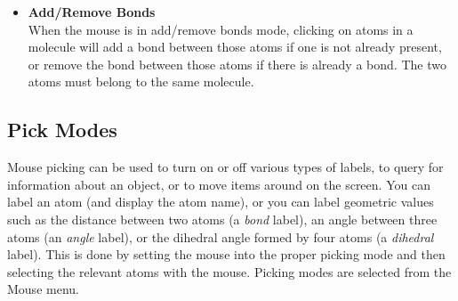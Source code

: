 \begin{itemize}
\item {\bf Add/Remove Bonds} \\
\label{ug:ui:disp:addbonds}
When the mouse is in add/remove bonds mode, clicking on atoms in a 
molecule will add a bond between those atoms if one is not already present,
or remove the bond between those atoms if there is already a bond.  The
two atoms must belong to the same molecule.  

\end{itemize}



\subsection{Pick Modes}
\label{ug:ui:disp:pick}
Mouse picking can be used to turn on or off various types
of labels, to query for information about an object, or to move items
around on the screen.  You can label an atom (and display the atom
name), or you can label geometric values such as the
distance between two atoms (a {\em bond} label), an angle between three
atoms (an {\em angle} label), or the dihedral angle formed by four
atoms (a {\em dihedral} label).  This is done by setting the mouse
into the proper picking mode and then selecting the relevant atoms
with the mouse.  Picking modes are selected from the {\sf Mouse} menu.

